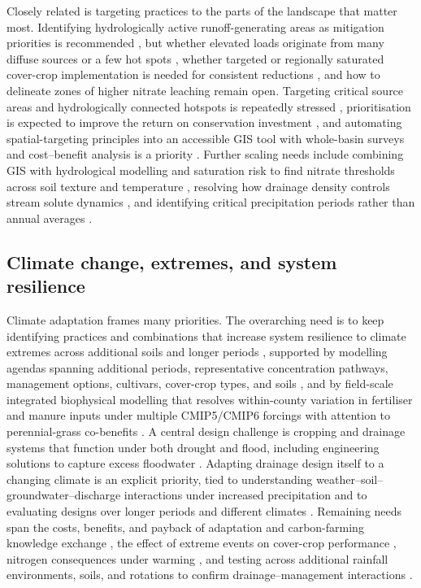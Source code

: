 \documentclass[11pt]{article}
\begin{document}
Closely related is targeting practices to the parts of the landscape that matter
most. Identifying hydrologically active runoff-generating areas as mitigation
priorities is recommended \parencite{Melland2008}, but whether elevated loads
originate from many diffuse sources or a few hot spots
\parencite{Irvine2019}, whether targeted or regionally saturated cover-crop
implementation is needed for consistent reductions \parencite{Speir2022}, and how
to delineate zones of higher nitrate leaching \parencite{Bakhsh2005b} remain
open. Targeting critical source areas and hydrologically connected hotspots is
repeatedly stressed \parencite{McDowell2015,Brendel2019}, prioritisation is
expected to improve the return on conservation investment
\parencite{Makhtoumi2025}, and automating spatial-targeting principles into an
accessible GIS tool with whole-basin surveys and cost--benefit analysis is a
priority \parencite{Kvítek2023}. Further scaling needs include combining GIS with
hydrological modelling and saturation risk to find nitrate thresholds across
soil texture and temperature \parencite{Smith2023}, resolving how drainage
density controls stream solute dynamics \parencite{Kennedy2012}, and identifying
critical precipitation periods rather than annual averages \parencite{Salo2006}.

\subsection{Climate change, extremes, and system resilience}

Climate adaptation frames many priorities. The overarching need is to keep
identifying practices and combinations that increase system resilience to
climate extremes across additional soils and longer periods
\parencite{Saha2024}, supported by modelling agendas spanning additional
periods, representative concentration pathways, management options, cultivars,
cover-crop types, and soils \parencite{Malone2020}, and by field-scale
integrated biophysical modelling that resolves within-county variation in
fertiliser and manure inputs under multiple CMIP5/CMIP6 forcings with attention
to perennial-grass co-benefits \parencite{Ferin2023}. A central design
challenge is cropping and drainage systems that function under both drought and
flood, including engineering solutions to capture excess floodwater
\parencite{Dietzel2016}. Adapting drainage design itself to a changing climate is
an explicit priority, tied to understanding weather--soil--groundwater--discharge
interactions under increased precipitation and to evaluating designs over longer
periods and different climates
\parencite{Deelstra2015,Tuohy2018,Malota2024,Deelstra2014,Deelstra2014b}.
Remaining needs span the costs, benefits, and payback of adaptation and
carbon-farming knowledge exchange \parencite{PeltonenSainio2021}, the effect of
extreme events on cover-crop performance \parencite{Gupta2023b}, nitrogen
consequences under warming \parencite{Haghnazari2020}, and testing across
additional rainfall environments, soils, and rotations to confirm
drainage--management interactions
\parencite{Takeshima2023,Liu2025,Grewal2025,Negm2014,BENOIT1967}.
\end{document}
